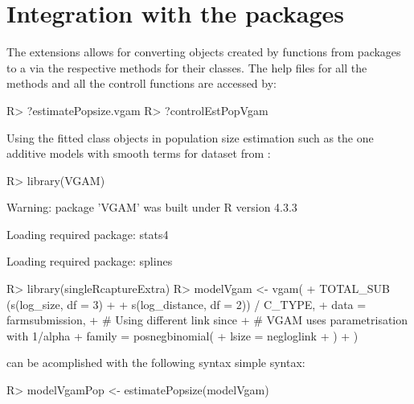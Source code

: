 \documentclass[
]{jss}
\newcommand{\1}{\mathcal{I}} \newcommand{\bx}{\boldsymbol{x}}
\begin{document}
\section[Integration with the]{Integration with the 
packages}\label{VGAMcountreg-packages}

The  extensions allows for converting objects
created by  functions from packages
 to a  via the
respective  methods for their classes. The help
files for all the methods and all the controll functions are accessed
by:

\begin{CodeChunk}
\begin{CodeInput}
R> ?estimatePopsize.vgam
R> ?controlEstPopVgam
\end{CodeInput}
\end{CodeChunk}

Using the fitted  class objects in
population size estimation such as the one additive models with smooth
terms for dataset from \cite{chao}:

\begin{CodeChunk}
\begin{CodeInput}
R> library(VGAM)
\end{CodeInput}
\begin{CodeOutput}
Warning: package 'VGAM' was built under R version 4.3.3
\end{CodeOutput}
\begin{CodeOutput}
Loading required package: stats4
\end{CodeOutput}
\begin{CodeOutput}
Loading required package: splines
\end{CodeOutput}
\begin{CodeInput}
R> library(singleRcaptureExtra)
R> modelVgam <- vgam(
+   TOTAL_SUB ~ (s(log_size, df  = 3) + 
+                  s(log_distance, df  = 2)) / C_TYPE,
+   data = farmsubmission,
+   # Using different link since
+   # VGAM uses parametrisation with 1/alpha
+   family = posnegbinomial(
+     lsize = negloglink
+   )
+ )
\end{CodeInput}
\end{CodeChunk}

can be acomplished with the following syntax simple syntax:

\begin{CodeChunk}
\begin{CodeInput}
R> modelVgamPop <- estimatePopsize(modelVgam)
\end{CodeInput}
\end{CodeChunk}
\end{document}
